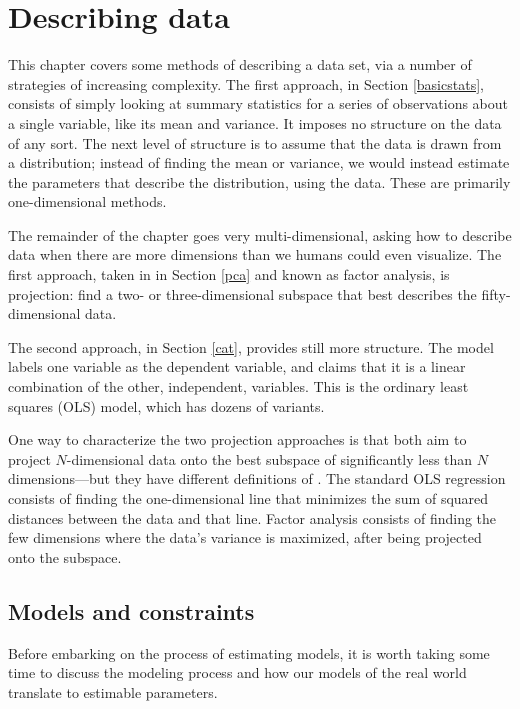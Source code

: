 \chapter{Describing data} \label{projections}

This chapter covers some methods of describing a data set, via a
number of strategies of increasing complexity. 
The first approach, in Section \ref{basicstats}, consists of simply looking
at summary statistics for a series of observations about a single
variable, like its mean and variance. It imposes no structure on the
data of any sort. The next level of structure is to
assume that the data is drawn from a distribution; instead of finding
the mean or variance, we would instead estimate the parameters that
describe the distribution, using the data. These are primarily
one-dimensional methods.

The remainder of the chapter goes very multi-dimensional, asking how
to describe data when there are more dimensions than we humans could
even visualize. The first approach, taken in in Section \ref{pca} and
known as factor analysis,
is projection: find a two- or three-dimensional subspace that best
describes the fifty-dimensional data. 

The second approach, in Section \ref{cat}, provides still more
structure. The model labels one variable as the dependent variable, and claims
that it is a linear combination of the other, independent, variables.
This is the ordinary least squares (OLS) model, which has dozens of variants.

One way to characterize the two projection approaches is that both
aim to project $N$-di\-men\-sion\-al data onto the best subspace of
significantly less than $N$ di\-men\-sions---but they have different
definitions of .  The standard OLS  regression consists of finding the one-dimensional line
that minimizes the sum of squared distances between the data and that
line. Factor analysis consists of finding the few dimensions where the
data's variance is maximized, after being projected onto the subspace.

\section{Models and constraints}
Before embarking on the process of estimating models, it is worth taking
some time to discuss the modeling process and how our models of the
real world translate to estimable parameters.

